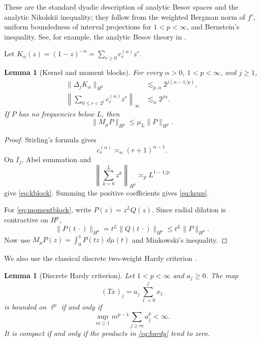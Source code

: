 \documentclass[11pt]{article}
\newtheorem{lemma}[theorem]{Lemma}
\begin{document}
These are the standard dyadic description of analytic Besov spaces and the
analytic Nikolskii inequality; they follow from the weighted Bergman norm of
\(f'\), uniform boundedness of interval projections for \(1<p<\infty\),
and Bernstein's inequality.  See, for example, the analytic Besov theory in
\cite{Zhu}.

Let \(K_\alpha(z)=(1-z)^{-\alpha}=\sum_{r\geq0}c_r^{(\alpha)}z^r\).

\begin{lemma}[Kernel and moment blocks]\label{lem:blocks}
For every \(\alpha>0\), \(1<p<\infty\), and \(j\geq1\),
\begin{align}
 \|\Delta_jK_\alpha\|_{H^p}
 &\lesssim_{p,\alpha}2^{j(\alpha-1/p)},\label{eq:kblock}\\
 \left\|\sum_{0\leq r<2^j}c_r^{(\alpha)}z^r\right\|_\infty
 &\lesssim_\alpha2^{j\alpha}.\label{eq:ksup}
\end{align}
If \(P\) has no frequencies below \(L\), then
\begin{equation}\label{eq:momentblock}
 \|M_\mu P\|_{H^p}\leq\mu_L\|P\|_{H^p}.
\end{equation}
\end{lemma}

\begin{proof}
Stirling's formula gives
\[
 c_r^{(\alpha)}\asymp_\alpha(r+1)^{\alpha-1}.
\]
On \(I_j\), Abel summation and
\[
 \left\|\sum_{k=0}^{L}z^k\right\|_{H^p}
 \asymp_p L^{1-1/p}
\]
give \eqref{eq:kblock}.  Summing the positive coefficients gives
\eqref{eq:ksup}.

For \eqref{eq:momentblock}, write \(P(z)=z^LQ(z)\).  Since radial dilation
is contractive on \(H^p\),
\[
 \|P(t\,\cdot)\|_{H^p}
 =t^L\|Q(t\,\cdot)\|_{H^p}
 \leq t^L\|P\|_{H^p}.
\]
Now use
\(M_\mu P(z)=\int_0^1P(tz)\,d\mu(t)\) and Minkowski's inequality.
\end{proof}

We also use the classical discrete two-weight Hardy criterion
\cite{Muckenhoupt}.

\begin{lemma}[Discrete Hardy criterion]\label{lem:hardy}
Let \(1<p<\infty\) and \(a_j\geq0\).  The map
\[
 (Tx)_j=a_j\sum_{\ell=0}^{j}x_\ell
\]
is bounded on \(\ell^p\) if and only if
\begin{equation}\label{eq:hardy}
 \sup_{m\geq1}m^{p-1}\sum_{j\geq m}a_j^p<\infty.
\end{equation}
It is compact if and only if the products in \eqref{eq:hardy} tend to zero.
\end{lemma}
\end{document}
